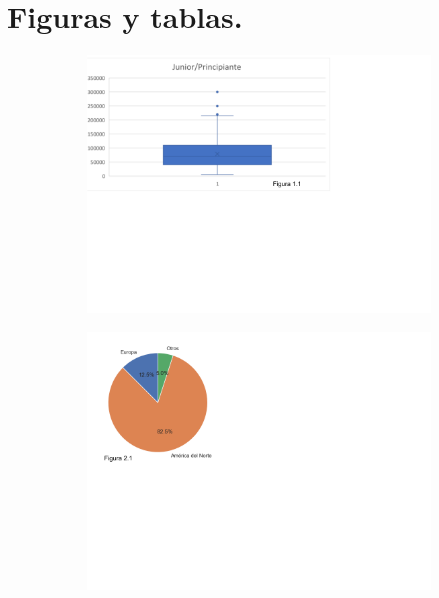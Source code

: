 \documentclass{article}
\begin{document}
	\section*{Figuras y tablas.}		
	\begin{figure}[htbp] %
		\centering
		\begin{subfigure}[b]{1.1\textwidth}
			\includegraphics[width=\textwidth]{FigurasTablas/figura1.1diagrama}
			\label{figura 1.1 diagrama}
		\end{subfigure}
		\begin{subfigure}[b]{1.1\textwidth}
			\includegraphics[width=1.8\textwidth]{FigurasTablas/figura2.1graficotorta.png}
			\label{figura2.1 torta}
		\end{subfigure}	
	\end{figure}
\end{document}

